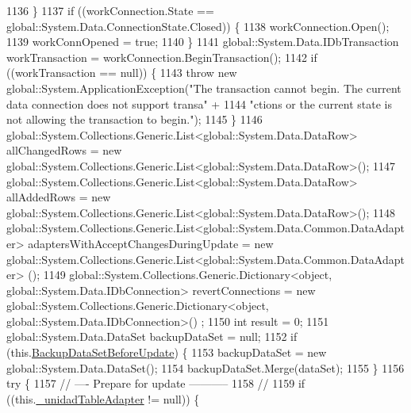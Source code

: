 \begin{DoxyCode}
1136             \}
1137             \textcolor{keywordflow}{if} ((workConnection.State == global::System.Data.ConnectionState.Closed)) \{
1138                 workConnection.Open();
1139                 workConnOpened = \textcolor{keyword}{true};
1140             \}
1141             global::System.Data.IDbTransaction workTransaction = workConnection.BeginTransaction();
1142             \textcolor{keywordflow}{if} ((workTransaction == null)) \{
1143                 \textcolor{keywordflow}{throw} \textcolor{keyword}{new} global::System.ApplicationException(\textcolor{stringliteral}{"The transaction cannot begin. The current
       data connection does not support transa"} +
1144                         \textcolor{stringliteral}{"ctions or the current state is not allowing the transaction to begin."});
1145             \}
1146             global::System.Collections.Generic.List<global::System.Data.DataRow> allChangedRows = \textcolor{keyword}{new} 
      global::System.Collections.Generic.List<global::System.Data.DataRow>();
1147             global::System.Collections.Generic.List<global::System.Data.DataRow> allAddedRows = \textcolor{keyword}{new} 
      global::System.Collections.Generic.List<global::System.Data.DataRow>();
1148             global::System.Collections.Generic.List<global::System.Data.Common.DataAdapter> 
      adaptersWithAcceptChangesDuringUpdate = \textcolor{keyword}{new} global::System.Collections.Generic.List<global::System.Data.Common.DataAdapter>
      ();
1149             global::System.Collections.Generic.Dictionary<object, global::System.Data.IDbConnection> 
      revertConnections = \textcolor{keyword}{new} global::System.Collections.Generic.Dictionary<object, global::System.Data.IDbConnection>()
      ;
1150             \textcolor{keywordtype}{int} result = 0;
1151             global::System.Data.DataSet backupDataSet = null;
1152             \textcolor{keywordflow}{if} (this.\hyperlink{class_proyecto___integrador__3_1_1ds_unidad_table_adapters_1_1_table_adapter_manager_aac31a1655c1548db2583fb7edad0e251}{BackupDataSetBeforeUpdate}) \{
1153                 backupDataSet = \textcolor{keyword}{new} global::System.Data.DataSet();
1154                 backupDataSet.Merge(dataSet);
1155             \}
1156             \textcolor{keywordflow}{try} \{
1157                 \textcolor{comment}{// ---- Prepare for update -----------}
1158                 \textcolor{comment}{//}
1159                 \textcolor{keywordflow}{if} ((this.\hyperlink{class_proyecto___integrador__3_1_1ds_unidad_table_adapters_1_1_table_adapter_manager_ad273398026bf55cc8cff4c34547f7564}{\_unidadTableAdapter} != null)) \{

\end{DoxyCode}
